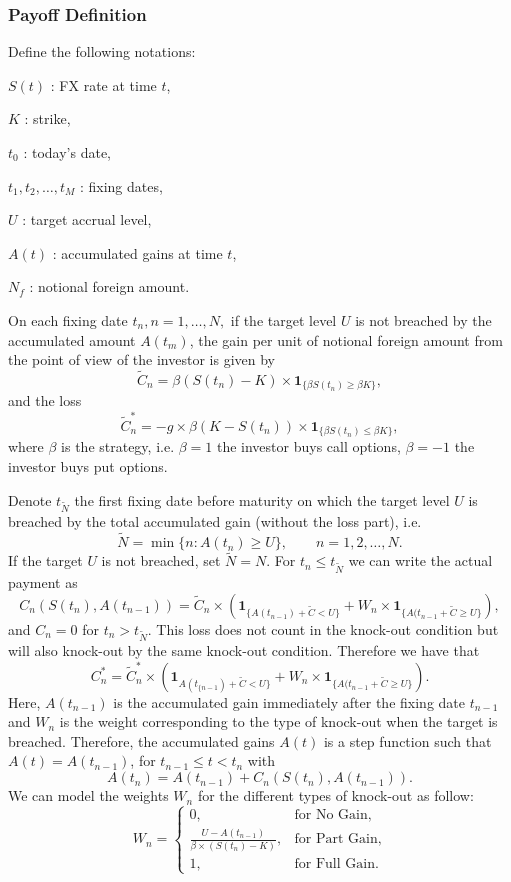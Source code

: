 \subsubsection*{Payoff Definition}
\label{sec:intro:Payoff}
Define the following notations:
\begin{my_list_item}
\item $S(t)$ : FX rate at time $t$,
\item $K$ : strike,
\item $t_0$ : today's date,
\item $t_1,t_2,\ldots,t_M$ : fixing dates,
\item $U$ : target accrual level,
\item $A(t)$ : accumulated gains at time $t$,
\item $N_f$ : notional foreign amount.
\end{my_list_item}

On each fixing date $t_n, n = 1,\ldots,N,$ if the target level $U$ is not breached by the accumulated amount $A(t_m)$, the gain per unit of notional foreign amount from the point of view of the investor is given by
\[\tilde{C}_n = \beta(S(t_n)-K)\times \mathbf{1}_{\{\beta S(t_n)\geq \beta K\}}, \]
and the loss
\[\tilde{C}_n^\ast = -g \times \beta(K-S(t_n))\times \mathbf{1}_{\{\beta S(t_n)\leq \beta K\}}, \]
where $\beta$ is the strategy, i.e. $\beta = 1$ the investor buys call options, $\beta = -1$ the investor buys put options.

Denote $t_{\tilde{N}}$ the first fixing date before maturity on which the target level $U$ is breached by the total accumulated gain (without the loss part), i.e.
\[\tilde{N}=\min\{n: A(t_n)\geq U\},\qquad n = 1,2,\ldots,N.\]
If the target $U$ is not breached, set $\tilde{N} = N$. For $t_n \leq t_{\tilde{N}}$ we can write the actual payment as
\begin{equation}\label{eq:TARN:gain}
C_n(S(t_n),A(t_{n-1})) = \tilde{C}_n\times \left(\mathbf{1}_{\{A(t_{n-1})+\tilde{C}<U\}}+W_n\times\mathbf{1}_{\{A(t_{n-1}+\tilde{C}\geq U\}}\right),
\end{equation}
and $C_n=0$ for $t_n>t_{\tilde{N}}$. This loss does not count in the knock-out condition but will also knock-out by the same knock-out condition. Therefore we have that
\begin{equation}\label{eq:TARN:loss}
C^\ast_n = \tilde{C}_n^\ast\times \left(\mathbf{1}_{A(t_{\{n-1})+\tilde{C}<U\}}+W_n\times\mathbf{1}_{\{A(t_{n-1}+\tilde{C}\geq U\}}\right).
\end{equation}
Here, $A(t_{n-1})$ is the accumulated gain immediately after the fixing date $t_{n-1}$ and $W_n$ is the weight corresponding to the type of knock-out when the target is breached. Therefore, the accumulated gains $A(t)$ is a step function such that $A(t) = A(t_{n-1})$, for $t_{n-1}\leq t < t_n$ with
\[A(t_n)= A(t_{n-1}) + C_n(S(t_n),A(t_{n-1})).\]
We can model the weights $W_n$ for the different types of knock-out as follow:
\[W_n = \begin{cases}
0, &\text{for No Gain,} \\
\frac{U-A(t_{n-1})}{\beta\times(S(t_n)-K)}, & \text{for Part Gain,}\\
1, &\text{for Full Gain.}
\end{cases}\]

